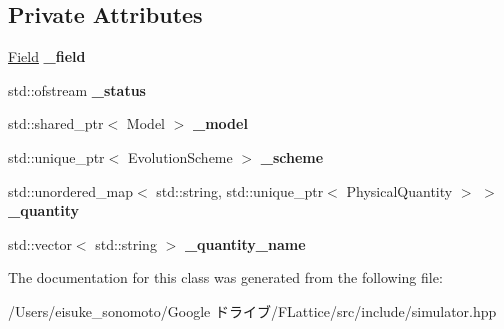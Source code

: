 \subsection*{Private Attributes}
\begin{DoxyCompactItemize}
\item 
\mbox{\label{class_simulator_a9c80bf222436e0c2ea9929fc64f396c3}} 
\mbox{\hyperlink{struct_field}{Field}} {\bfseries \+\_\+field}
\item 
\mbox{\label{class_simulator_abbdae2b6367fe3327df534f96cacc43e}} 
std\+::ofstream {\bfseries \+\_\+status}
\item 
\mbox{\label{class_simulator_ab420c9b58c941b1f40c9c315b2088511}} 
std\+::shared\+\_\+ptr$<$ Model $>$ {\bfseries \+\_\+model}
\item 
\mbox{\label{class_simulator_a148923591e31f511fa395b7c611479a4}} 
std\+::unique\+\_\+ptr$<$ Evolution\+Scheme $>$ {\bfseries \+\_\+scheme}
\item 
\mbox{\label{class_simulator_a686066f812565c0779cab673bf0f95a3}} 
std\+::unordered\+\_\+map$<$ std\+::string, std\+::unique\+\_\+ptr$<$ Physical\+Quantity $>$ $>$ {\bfseries \+\_\+quantity}
\item 
\mbox{\label{class_simulator_a84436afba283509aa0f7a624f418d4fd}} 
std\+::vector$<$ std\+::string $>$ {\bfseries \+\_\+quantity\+\_\+name}
\end{DoxyCompactItemize}


The documentation for this class was generated from the following file\+:\begin{DoxyCompactItemize}
\item 
/\+Users/eisuke\+\_\+sonomoto/\+Google ドライブ/\+F\+Lattice/src/include/simulator.\+hpp\end{DoxyCompactItemize}
